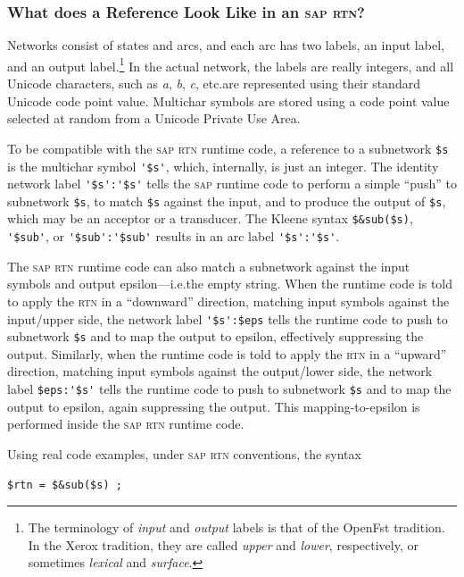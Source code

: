 \documentclass[letterpaper,12pt]{article}
\newcommand{\acro}{\textsc}
\begin{document}
\subsubsection{What does a Reference Look Like in an \acro{sap} \acro{rtn}?}

Networks consist of states and arcs, and each arc has two labels, an
input label, and an output label.\footnote{The terminology of
\emph{input} and \emph{output} labels is that of the OpenFst tradition.
In the Xerox tradition, they are called \emph{upper} and \emph{lower},
respectively, or sometimes \emph{lexical} and \emph{surface}.}  In the
actual network, the labels are really integers, and all Unicode
characters, such as \emph{a}, \emph{b}, \emph{c}, etc.\@ are represented
using their standard Unicode code point value.  Multichar symbols are
stored using a code point value selected at random from a Unicode Private
Use Area.

To be compatible with the \acro{sap} \acro{rtn} runtime code, a reference
to a subnetwork \verb!$s! is the multichar symbol \verb!'$s'!, which,
internally, is just an integer.  The identity network label
\verb!'$s':'$s'! tells the \acro{sap} runtime code to perform a simple
``push'' to subnetwork \verb!$s!, to match \verb!$s! against the input,
and to produce the output of \verb!$s!, which may be an acceptor or a
transducer.  The Kleene syntax \verb!$&sub($s)!, \verb!'$sub'!, or
\verb!'$sub':'$sub'! results in an arc label \verb!'$s':'$s'!.

The \acro{sap} \acro{rtn} runtime code can also match a subnetwork
against the input symbols and output epsilon---i.e.\@ the empty string.
When the runtime code is told to apply the \acro{rtn} in a ``downward''
direction, matching input symbols against the input/upper side, the
network label \verb!'$s':$eps! tells the runtime code to push to
subnetwork \verb!$s! and to map the output to epsilon, effectively
suppressing the output.  Similarly, when the runtime code is told to
apply the \acro{rtn} in a ``upward'' direction, matching input symbols
against the output/lower side, the network label \verb!$eps:'$s'! tells
the runtime code to push to subnetwork \verb!$s! and to map the output to
epsilon, again suppressing the output.  This mapping-to-epsilon is
performed inside the \acro{sap} \acro{rtn} runtime code.

Using real code examples, under \acro{sap} \acro{rtn} conventions, the syntax

\begin{Verbatim}[fontsize=\small]
$rtn = $&sub($s) ;
\end{Verbatim}
\end{document}
